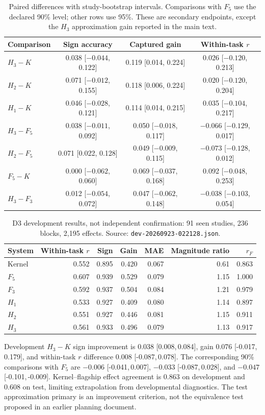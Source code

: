 \documentclass[11pt]{article}
\newcommand{\CI}[2]{[#1,\,#2]}
\begin{document}
\begin{table}[!htbp]
\centering\footnotesize
\caption{Paired differences with study-bootstrap intervals. Comparisons with $F_5$ use the declared 90\% level; other rows use 95\%. These are secondary endpoints, except the $H_3$ approximation gain reported in the main text.}
\begin{tabular}{lccc}
\toprule
Comparison & Sign accuracy & Captured gain & Within-task $r$\\
\midrule
$H_3-K$ & 0.038 [$-0.044$, 0.122] & 0.119 [0.014, 0.224] & 0.026 [$-0.120$, 0.213]\\
$H_2-K$ & 0.071 [$-0.012$, 0.155] & 0.118 [0.006, 0.224] & 0.020 [$-0.120$, 0.204]\\
$H_1-K$ & 0.046 [$-0.028$, 0.121] & 0.114 [0.014, 0.215] & 0.035 [$-0.104$, 0.217]\\
$H_3-F_5$ & 0.038 [$-0.011$, 0.092] & 0.050 [$-0.018$, 0.117] & $-0.066$ [$-0.129$, 0.017]\\
$H_2-F_5$ & 0.071 [0.022, 0.128] & 0.049 [$-0.009$, 0.115] & $-0.073$ [$-0.128$, 0.012]\\
$F_5-K$ & 0.000 [$-0.062$, 0.060] & 0.069 [$-0.037$, 0.168] & 0.092 [$-0.048$, 0.253]\\
$H_3-F_3$ & 0.012 [$-0.054$, 0.072] & 0.047 [$-0.062$, 0.148] & $-0.038$ [$-0.103$, 0.054]\\
\bottomrule
\end{tabular}
\end{table}

\begin{table}[!htbp]
\centering\small
\caption{D3 development results, not independent confirmation: 91 seen studies, 236 blocks, 2,195 effects. Source: \texttt{dev-20260923-022128.json}.}
\begin{tabular}{lrrrrrr}
\toprule
System & Within-task $r$ & Sign & Gain & MAE & Magnitude ratio & $r_F$\\
\midrule
Kernel & 0.552 & 0.895 & 0.420 & 0.067 & 0.61 & 0.863\\
$F_5$ & 0.607 & 0.939 & 0.529 & 0.079 & 1.15 & 1.000\\
$F_3$ & 0.592 & 0.937 & 0.504 & 0.084 & 1.21 & 0.979\\
$H_1$ & 0.533 & 0.927 & 0.409 & 0.080 & 1.14 & 0.897\\
$H_2$ & 0.551 & 0.927 & 0.446 & 0.081 & 1.15 & 0.911\\
$H_3$ & 0.561 & 0.933 & 0.496 & 0.079 & 1.13 & 0.917\\
\bottomrule
\end{tabular}
\end{table}
Development $H_3-K$ sign improvement is 0.038 \CI{0.008}{0.084}, gain 0.076 \CI{-0.017}{0.179}, and within-task $r$ difference 0.008 \CI{-0.087}{0.078}. The corresponding 90\% comparisons with $F_5$ are $-0.006$ \CI{-0.041}{0.007}, $-0.033$ \CI{-0.087}{0.028}, and $-0.047$ \CI{-0.101}{-0.009}. Kernel--flagship effect agreement is 0.863 on development and 0.608 on test, limiting extrapolation from developmental diagnostics. The test approximation primary is an improvement criterion, not the equivalence test proposed in an earlier planning document.
\end{document}
